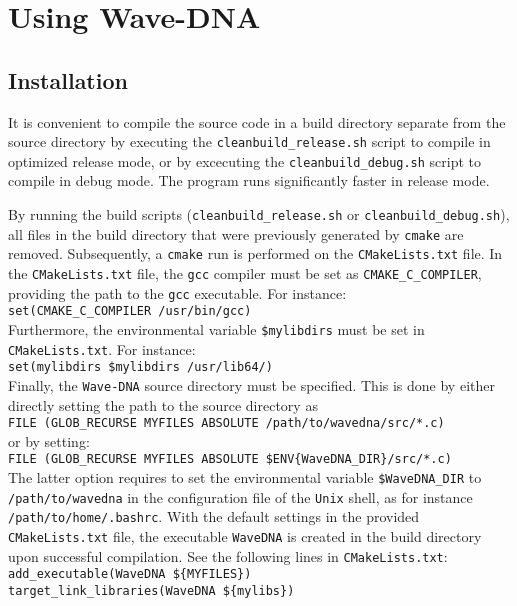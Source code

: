 \chapter{Using Wave-DNA}
\label{chap:Using Wave-DNA}



\section{Installation}
\label{sec:Installation}

It is convenient to compile the source code in a build directory separate from the source directory by executing the {\tt cleanbuild\_release.sh} script to compile in optimized release mode, or by excecuting the {\tt cleanbuild\_debug.sh} script to compile in debug mode. The program runs significantly faster in release mode.

By running the build scripts ({\tt cleanbuild\_release.sh} or {\tt cleanbuild\_debug.sh}), all files in the build directory that were previously generated by {\tt cmake} are removed. Subsequently, a {\tt cmake} run is performed on the {\tt CMakeLists.txt} file. In the {\tt CMakeLists.txt} file, the {\tt gcc} compiler must be set as {\tt CMAKE\_C\_COMPILER}, providing the path to the {\tt gcc} executable. For instance:
\\[8pt]
{\tt set(CMAKE\_C\_COMPILER /usr/bin/gcc)}
\\[8pt]
Furthermore, the environmental variable  {\tt \${mylibdirs}} must be set in {\tt CMakeLists.txt}. For instance:
\\[8pt]
{\tt set(mylibdirs \${mylibdirs} /usr/lib64/)}
\\[8pt]
Finally, the {\tt Wave-DNA} source directory must be specified. This is done by either directly setting the path to the source directory as
\\[8pt]
{\tt FILE (GLOB\_RECURSE MYFILES ABSOLUTE  /path/to/wavedna/src/*.c)}
\\[8pt]
or by setting:
\\[8pt]
{\tt FILE (GLOB\_RECURSE MYFILES ABSOLUTE  \$ENV\{WaveDNA\_DIR\}/src/*.c)}
\\[8pt]
The latter option requires to set the environmental variable {\tt \$WaveDNA\_DIR} to {\tt /path/to/wavedna} in the configuration file of the {\tt Unix} shell, as for instance {\tt /path/to/home/.bashrc}. With the default settings in the provided {\tt CMakeLists.txt} file, the executable {\tt WaveDNA} is created in the build directory upon successful compilation. See the following lines in {\tt CMakeLists.txt}:
\\[8pt]
{\tt add\_executable(WaveDNA \$\{MYFILES\})} \\
{\tt target\_link\_libraries(WaveDNA \$\{mylibs\})}
\\[8pt]


